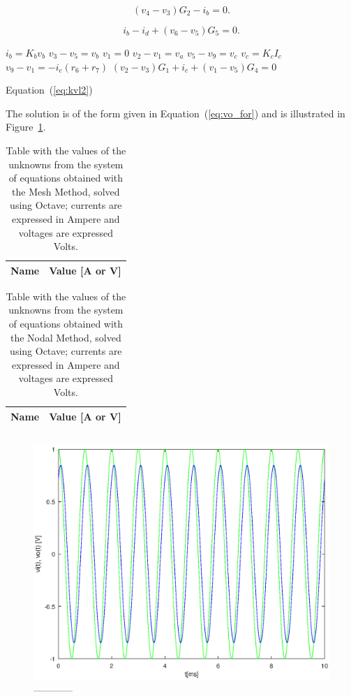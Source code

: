 \begin{equation}
  (v_4 - v_3)G_2 - i_b = 0.
\end{equation}

\begin{equation}
  i_b - i_d + (v_6 - v_5)G_5 = 0.
  \label{eq:kvl2}
\end{equation}

$i_b = K_b v_b$
$v_3 -v_5 = v_b$
$v_1= 0$
$v_2 - v_1 = v_a$
$v_5 - v_9 = v_c$
$v_c = K_c I_c$
$v_9 - v_1 = -i_c(r_6 + r_7)$
$(v_2 - v_3)G_1 + i_c +(v_1 - v_5)G_4 = 0$

Equation~(\ref{eq:kvl2}) 

The solution is of the form given in Equation~(\ref{eq:vo_for}) and is
illustrated in Figure~\ref{fig:forced}.





\begin{table}[h]
  \centering
  \begin{tabular}{|l|r|}
    \hline    
    {\bf Name} & {\bf Value [A or V]} \\ \hline
    
  \end{tabular}
  \caption{Table with the values of the unknowns from the system of equations obtained with the Mesh Method, solved using Octave; currents are expressed in Ampere and voltages are expressed Volts.}
  \label{tab:op}
\end{table}

\begin{table}[h]
  \centering
  \begin{tabular}{|l|r|}
    \hline    
    {\bf Name} & {\bf Value [A or V]} \\ \hline
    
  \end{tabular}
  \caption{Table with the values of the unknowns from the system of equations obtained with the Nodal Method, solved using Octave; currents are expressed in Ampere and voltages are expressed Volts.}
  \label{tab:op}
\end{table}




\begin{equation}
  
  \label{eq:vo_for}
\end{equation}

\begin{figure}[h] \centering
\includegraphics[width=0.8\linewidth]{forced.eps}
\caption{------------}
\label{fig:forced}
\end{figure}
